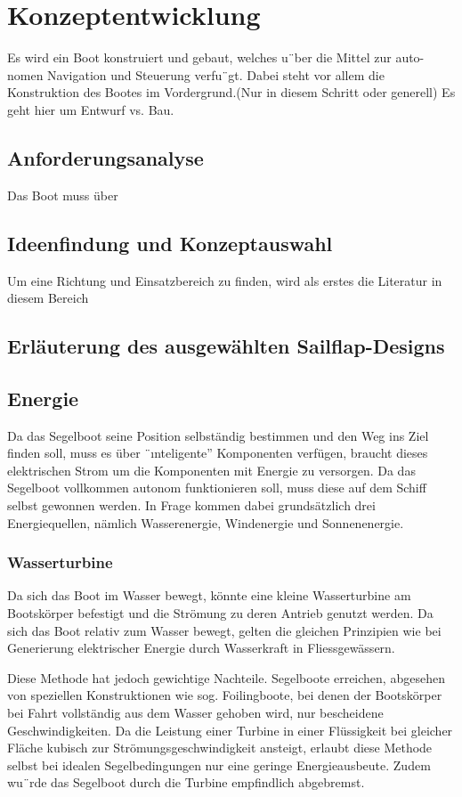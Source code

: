 
\chapter{Konzeptentwicklung }
\label{chap:konzeptentwicklung}


Es wird ein Boot konstruiert und gebaut, welches u¨ber die Mittel zur auto- nomen Navigation und Steuerung verfu¨gt. Dabei steht vor allem die Konstruktion des Bootes im Vordergrund.(Nur in diesem Schritt oder generell) Es geht hier um Entwurf vs. Bau.

\section{Anforderungsanalyse}
Das Boot muss über 
\section{Ideenfindung und Konzeptauswahl}
Um eine Richtung und Einsatzbereich zu finden, wird als erstes die Literatur in diesem Bereich 
\section{Erläuterung des ausgewählten Sailflap-Designs}


\section{Energie}
Da das Segelboot seine Position selbständig bestimmen und den Weg ins Ziel finden soll, muss es über ¨ınteligente” Komponenten verfügen, braucht dieses elektrischen Strom um die Komponenten mit Energie zu versorgen. Da das Segelboot vollkommen autonom funktionieren soll, muss diese auf dem Schiff selbst gewonnen werden. In Frage kommen dabei grundsätzlich drei Energiequellen, nämlich Wasserenergie, Windenergie und Sonnenenergie. 

\subsection{Wasserturbine}
Da sich das Boot im Wasser bewegt, könnte eine kleine Wasserturbine am Bootskörper befestigt und die Strömung zu deren Antrieb genutzt werden. Da sich das Boot relativ zum Wasser bewegt, gelten die gleichen Prinzipien wie bei Generierung elektrischer Energie durch Wasserkraft in Fliessgewässern.

Diese Methode hat jedoch gewichtige Nachteile. Segelboote erreichen, abgesehen von speziellen Konstruktionen wie sog. Foilingboote, bei denen der Bootskörper bei Fahrt vollständig aus dem Wasser gehoben wird, nur bescheidene Geschwindigkeiten. Da die Leistung einer Turbine in einer Flüssigkeit bei gleicher Fläche kubisch zur Strömungsgeschwindigkeit ansteigt, erlaubt diese Methode selbst bei idealen Segelbedingungen nur eine geringe Energieausbeute. Zudem wu¨rde das Segelboot durch die Turbine empfindlich abgebremst. 

